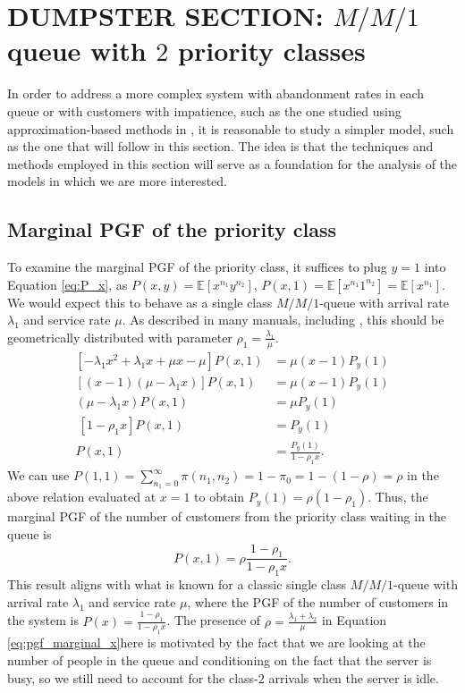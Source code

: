 










\section{ DUMPSTER SECTION: $M/M/1$ queue with $2$ priority classes}

In order to address a more complex system with abandonment rates in each queue or with customers with impatience, such as the one studied using approximation-based methods in \cite{de1992approximate}, it is reasonable to study a simpler model, such as the one that will follow in this section. The idea is that the techniques and methods employed in this section will serve as a foundation for the analysis of the models in which we are more interested.

\subsection{Marginal PGF of the priority class}

To examine the marginal PGF of the priority class, it suffices to plug $y=1$ into Equation \eqref{eq:P_x}, as $P(x,y)=\mathbb{E}\left[ x^{n_1}y^{n_2} \right]$, $P(x,1)=\mathbb{E}\left[ x^{n_1}1^{n_2} \right] =\mathbb{E}\left[ x^{n_1} \right]$. We would expect this to behave as a single class $M/M/1$-queue with arrival rate $\lambda_1$ and service rate $\mu$. As described in many manuals, including \cite{adan2002queueing}, this should be geometrically distributed with parameter $\rho_1 = \frac{\lambda_1}{\mu}$.
\begin{align}
    \left[ -\lambda_1 x^2 + \lambda_1 x + \mu x - \mu \right] P(x,1)
    &= \mu (x-1) P_y(1) \\
     \left[ (x-1) (\mu - \lambda_1 x) \right] P(x,1) 
     &= \mu (x-1) P_y(1) \\
      (\mu - \lambda_1 x)P(x,1) 
      &= \mu P_y(1) \\\
      \left[ 1-\rho_1 x \right] P(x,1)
      &= P_y(1) \\
      P(x,1)
      &= \frac{P_y(1)}{1 - \rho_1 x}.
\end{align}
We can use  $P(1,1)=\sum_{n_1=0}^{\infty} \pi(n_1,n_2) = 1 - \pi_0 = 1-(1-\rho)=\rho$ in the above relation evaluated at $x=1$ to obtain $P_y(1)= \rho (1 - \rho_1)$. Thus, the marginal PGF of the number of customers from the priority class waiting in the queue is
\begin{equation}
    P(x,1) = \rho \frac{1-\rho_1}{1-\rho_1x}. \label{eq:pgf_marginal_x}
\end{equation}
This result aligns with what is known for a classic single class $M/M/1$-queue with arrival rate $\lambda_1$ and service rate $\mu$, where the PGF of the number of customers in the system is $P(x)=\frac{1-\rho_1}{1 - \rho_1 x}$. The presence of $\rho=\frac{\lambda_1+\lambda_2}{\mu}$ in Equation \eqref{eq:pgf_marginal_x}here is motivated by the fact that we are looking at the number of people in the queue and conditioning on the fact that the server is busy, so we still need to account for the class-$2$ arrivals when the server is idle.

